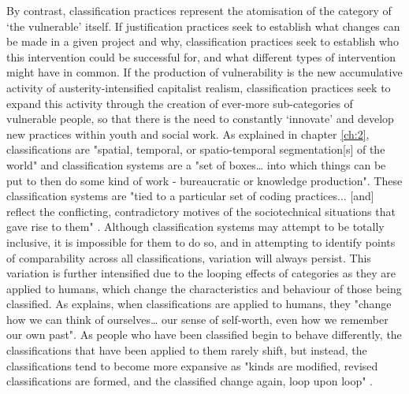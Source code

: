 By contrast, classification practices represent the atomisation of the category of `the vulnerable' itself. If justification practices seek to establish what changes can be made in a given project and why, classification practices seek to establish who this intervention could be successful for, and what different types of intervention might have in common. If the production of vulnerability is the new accumulative activity of austerity-intensified capitalist realism, classification practices seek to expand this activity through the creation of ever-more sub-categories of vulnerable people, so that there is the need to constantly `innovate' and develop new practices within youth and social work. As explained in chapter \ref{ch:2}, classifications are "spatial, temporal, or spatio-temporal segmentation[s] of the world" \citep[p. 110]{bowker_sorting_1999} and classification systems are a "set of boxes\ldots{} into which things can be put to then do some kind of work - bureaucratic or knowledge production". These classification systems are "tied to a particular set of coding practices... [and] reflect the conflicting, contradictory motives of the sociotechnical situations that gave rise to them" \cite[p. 64]{bowker_sorting_1999}.  Although classification systems may attempt to be totally inclusive, it is impossible for them to do so, and in attempting to identify points of comparability across all classifications, variation will always persist.  This variation is further intensified due to the looping effects of categories as they are applied to humans, which change the characteristics and behaviour of those being classified. As \citet[p. 369]{hacking_looping_1996} explains, when classifications are applied to humans, they "change how we can think of ourselves\ldots{} our sense of self-worth, even how we remember our own past". As people who have been classified begin to behave differently, the classifications that have been applied to them rarely shift, but instead, the classifications tend to become more expansive as "kinds are modified, revised classifications are formed, and the classified change again, loop upon loop" \citep[p. 370]{hacking_looping_1996}.

